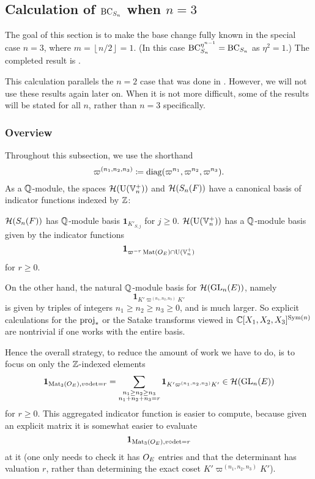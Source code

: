 \subsection{Calculation of $\operatorname{BC}_{S_n}$ when $n = 3$}
The goal of this section is to make the base change
fully known in the special case $n = 3$, where $m = \left\lfloor n/2 \right\rfloor = 1$.
(In this case $\operatorname{BC}_{S_n}^{\eta^{n-1}} = \operatorname{BC}_{S_n}$ as $\eta^2 = 1$.)
The completed result is .

This calculation parallels the $n = 2$ case that was done in \cite[Lemma 7.1.1]{ref:AFLspherical}.
However, we will not use these results again later on.
When it is not more difficult, some of the results will be stated for all $n$,
rather than $n = 3$ specifically.

\subsubsection{Overview}
Throughout this subsection, we use the shorthand
\[ \varpi^{(n_1, n_2, n_3)} \coloneqq \operatorname{diag}(\varpi^{n_1}, \varpi^{n_2}, \varpi^{n_3}). \]
As a $\mathbb Q$-module, the spaces $\mathcal H(\operatorname{U}(\mathbb V_n^+))$ and $\mathcal H(S_n(F))$
have a canonical basis of indicator functions indexed by $\mathbb Z$:
\begin{itemize}
  \ii $\mathcal H(S_n(F))$ has $\mathbb Q$-module basis $\mathbf{1}_{K'_{S,j}}$ for $j \ge 0$.
  \ii $\mathcal H(\operatorname{U}(\mathbb V_n^+))$ has a $\mathbb Q$-module basis given by the indicator functions
  \[ \mathbf{1}_{\varpi^{-r} \operatorname{Mat}(O_E) \cap \operatorname{U}(\mathbb V_n^+)} \]
  for $r \ge 0$.
\end{itemize}
On the other hand, the natural $\mathbb Q$-module basis for $\mathcal H(\operatorname{GL}_n(E))$, namely
\[ \mathbf{1}_{K'\varpi^{(n_1, n_2, n_3)}K'} \]
is given by triples of integers $n_1 \ge n_2 \ge n_3 \ge 0$, and is much larger.
So explicit calculations for the $\operatorname{proj}_\ast$ or the Satake transforms viewed in
$\mathbb C[X_1, X_2, X_3]^{\operatorname{Sym}(n)}$ are nontrivial if one works with the entire basis.

Hence the overall strategy, to reduce the amount of work we have to do,
is to focus on only the $\mathbb Z$-indexed elements
\[
  \mathbf{1}_{\operatorname{Mat}_3(O_E), v\circ\det=r}
  = \sum_{\substack{n_1 \ge n_2 \ge n_3 \\ n_1 + n_2 + n_3 = r}}
  \mathbf{1}_{K'\varpi^{(n_1, n_2, n_3)}K'} \in \mathcal H(\operatorname{GL}_n(E))
\]
for $r \ge 0$.
This aggregated indicator function is easier to compute,
because given an explicit matrix it is somewhat easier
to evaluate \[ \mathbf{1}_{\operatorname{Mat}_3(O_E), v\circ\det=r} \]
at it (one only needs to check it has $O_E$ entries
and that the determinant has valuation $r$,
rather than determining the exact coset $K'\varpi^{(n_1, n_2, n_3)}K'$).

